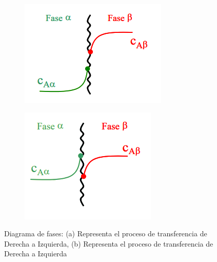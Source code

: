 \documentclass[11pt]{book}
\begin{document}
\begin{figure}[H]
  \begin{subfigure}[b]{0.45\textwidth}
    \includegraphics[width=\textwidth]{img/absorcion/Absorcion_2a.PNG}
    \caption{ }
    \label{fig:Absorcion_2a}
  \end{subfigure}
  \hfill
  \begin{subfigure}[b]{0.39\textwidth}
    \includegraphics[width=\textwidth]{img/absorcion/Absorcion_2b.PNG}
    \caption{ }
    \label{fig:Absorcion_2b}
  \end{subfigure}
  \caption{Diagrama de fases: (a) Representa el proceso de transferencia de Derecha a Izquierda, (b) Representa el proceso de transferencia de Derecha a Izquierda}
\end{figure}
\end{document}
